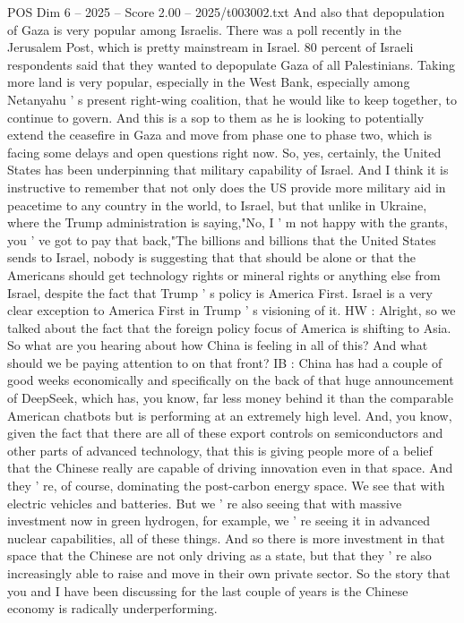 \begin{textsample}{POS Dim 6 – 2025 – Score 2.00 – 2025/t003002.txt}
And also that depopulation of Gaza is very popular among Israelis.
There was a poll recently in the Jerusalem Post, which is pretty mainstream in Israel. 80 percent of Israeli respondents said that they wanted to depopulate Gaza of all Palestinians.
Taking more land is very popular, especially in the West Bank, especially among Netanyahu ' s present right-wing coalition, that he would like to keep together, to continue to govern.
And this is a sop to them as he is looking to potentially extend the ceasefire in Gaza and move from phase one to phase two, which is facing some delays and open questions right now.
So, yes, certainly, the United States has been underpinning that military capability of Israel.
And I think it is instructive to remember that not only does the US provide more military aid in peacetime to any country in the world, to Israel, but that unlike in Ukraine, where the Trump administration is saying,"No, I ' m not happy with the grants, you ' ve got to pay that back,"The billions and billions that the United States sends to Israel, nobody is suggesting that that should be alone or that the Americans should get technology rights or mineral rights or anything else from Israel, despite the fact that Trump ' s policy is America First.
Israel is a very clear exception to America First in Trump ' s visioning of it.
HW : Alright, so we talked about the fact that the foreign policy focus of America is shifting to Asia.
So what are you hearing about how China is feeling in all of this?
And what should we be paying attention to on that front?
IB : China has had a couple of good weeks economically and specifically on the back of that huge announcement of DeepSeek, which has, you know, far less money behind it than the comparable American chatbots but is performing at an extremely high level.
And, you know, given the fact that there are all of these export controls on semiconductors and other parts of advanced technology, that this is giving people more of a belief that the Chinese really are capable of driving innovation even in that space.
And they ' re, of course, dominating the post-carbon energy space.
We see that with electric vehicles and batteries.
But we ' re also seeing that with massive investment now in green hydrogen, for example, we ' re seeing it in advanced nuclear capabilities, all of these things.
And so there is more investment in that space that the Chinese are not only driving as a state, but that they ' re also increasingly able to raise and move in their own private sector.
So the story that you and I have been discussing for the last couple of years is the Chinese economy is radically underperforming.

\end{textsample}
